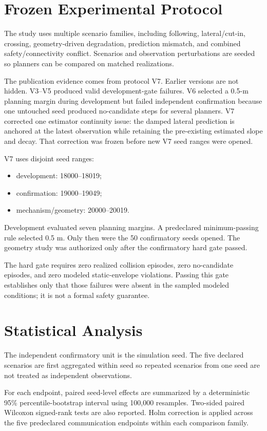 \documentclass[journal]{IEEEtran}
\begin{document}
\section{Frozen Experimental Protocol}
The study uses multiple scenario families, including following, lateral/cut-in, crossing, geometry-driven degradation, prediction mismatch, and combined safety/connectivity conflict. Scenarios and observation perturbations are seeded so planners can be compared on matched realizations.

The publication evidence comes from protocol V7. Earlier versions are not hidden. V3--V5 produced valid development-gate failures. V6 selected a 0.5-m planning margin during development but failed independent confirmation because one untouched seed produced no-candidate steps for several planners. V7 corrected one estimator continuity issue: the damped lateral prediction is anchored at the latest observation while retaining the pre-existing estimated slope and decay. That correction was frozen before new V7 seed ranges were opened.

V7 uses disjoint seed ranges:
\begin{itemize}
\item development: 18000--18019;
\item confirmation: 19000--19049;
\item mechanism/geometry: 20000--20019.
\end{itemize}
Development evaluated seven planning margins. A predeclared minimum-passing rule selected 0.5 m. Only then were the 50 confirmatory seeds opened. The geometry study was authorized only after the confirmatory hard gate passed.

The hard gate requires zero realized collision episodes, zero no-candidate episodes, and zero modeled static-envelope violations. Passing this gate establishes only that those failures were absent in the sampled modeled conditions; it is not a formal safety guarantee.

\section{Statistical Analysis}
The independent confirmatory unit is the simulation seed. The five declared scenarios are first aggregated within seed so repeated scenarios from one seed are not treated as independent observations.

For each endpoint, paired seed-level effects are summarized by a deterministic 95\% percentile-bootstrap interval using 100,000 resamples. Two-sided paired Wilcoxon signed-rank tests are also reported. Holm correction is applied across the five predeclared communication endpoints within each comparison family.
\end{document}
